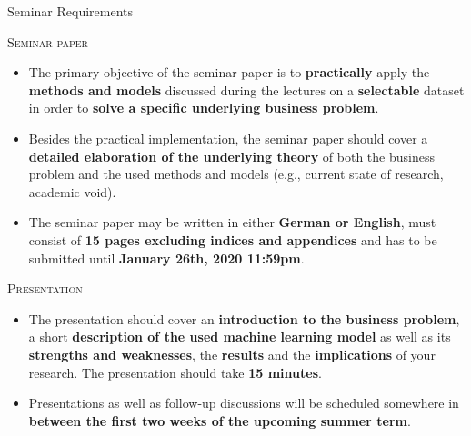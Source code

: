 \documentclass[document.tex]{subfiles}
\begin{document}
    \unless\iffom
    \begin{frame}{Seminar Requirements}
        \begin{alertblock}{\textsc{Seminar paper}}
            \begin{itemize}
                \item The primary objective of the seminar paper is to \textbf{practically} apply the \textbf{methods and models} discussed during the lectures on a \textbf{selectable} dataset in order to \textbf{solve a specific underlying business problem}.
                \item Besides the practical implementation, the seminar paper should cover a \textbf{detailed elaboration of the underlying theory} of both the business problem and the used methods and models (e.g., current state of research, academic void).
                \item The seminar paper may be written in either \textbf{German or English}, must consist of \textbf{15 pages excluding indices and appendices} and has to be submitted until \textbf{January 26th, 2020 11:59pm}. 
            \end{itemize}
        \end{alertblock}
        \begin{alertblock}{\textsc{Presentation}}
            \begin{itemize}
                \item The presentation should cover an \textbf{introduction to the business problem}, a short \textbf{description of the used machine learning model} as well as its \textbf{strengths and weaknesses}, the \textbf{results} and the \textbf{implications} of your research. The presentation should take \textbf{15 minutes}.
                \item Presentations as well as follow-up discussions will be scheduled somewhere in \textbf{between the first two weeks of the upcoming summer term}.
            \end{itemize}
        \end{alertblock}	
    \end{frame}
\end{document}
